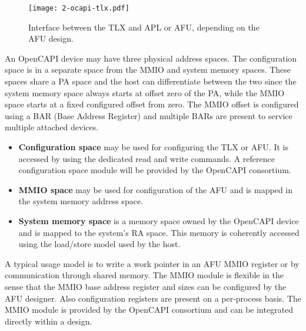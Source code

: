 \begin{figure}[H]
  \centering
  \texttt{[image: 2-ocapi-tlx.pdf]}
  \caption{Interface between the TLX and APL or AFU, depending on the AFU design.}
  \label{fig:2-ocapi-tlx}
\end{figure}

An OpenCAPI device may have three physical address spaces. The configuration space is in a separate space from the MMIO and system memory spaces. These spaces share a PA space and the host can differentiate between the two since the system memory space always starts at offset zero of the PA, while the MMIO space starts at a fixed configured offset from zero. The MMIO offset is configured using a BAR (Base Address Register) and multiple BARs are present to service multiple attached devices.
\begin{itemize}
  \item{\textbf{Configuration space} may be used for configuring the TLX or AFU. It is accessed by using the dedicated read and write commands. A reference configuration space module will be provided by the OpenCAPI consortium.}
  \item{\textbf{MMIO space} may be used for configuration of the AFU and is mapped in the system memory address space.}
  \item{\textbf{System memory space} is a memory space owned by the OpenCAPI device and is mapped to the system's RA space. This memory is coherently accessed using the load/store model used by the host.}
\end{itemize}

A typical usage model is to write a work pointer in an AFU MMIO register or by communication through shared memory. The MMIO module is flexible in the sense that the MMIO base address register and sizes can be configured by the AFU designer. Also configuration registers are present on a per-process basis. The MMIO module is provided by the OpenCAPI consortium and can be integrated directly within a design.



